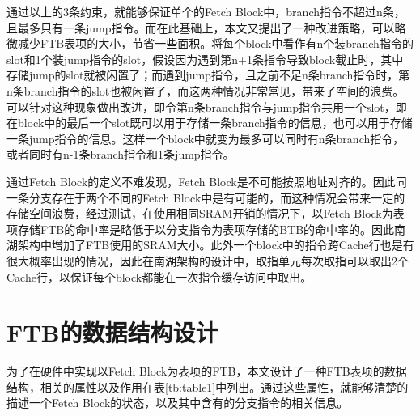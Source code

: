 通过以上的3条约束，就能够保证单个的Fetch Block中，branch指令不超过n条，且最多只有一条jump指令。而在此基础上，本文又提出了一种改进策略，可以略微减少FTB表项的大小，节省一些面积。将每个block中看作有n个装branch指令的slot和1个装jump指令的slot，假设因为遇到第n+1条指令导致block截止时，其中存储jump的slot就被闲置了；而遇到jump指令，且之前不足n条branch指令时，第n条branch指令的slot也被闲置了，而这两种情况非常常见，带来了空间的浪费。可以针对这种现象做出改进，即令第n条branch指令与jump指令共用一个slot，即在block中的最后一个slot既可以用于存储一条branch指令的信息，也可以用于存储一条jump指令的信息。这样一个block中就变为最多可以同时有n条branch指令，或者同时有n-1条branch指令和1条jump指令。

通过Fetch Block的定义不难发现，Fetch Block是不可能按照地址对齐的。因此同一条分支存在于两个不同的Fetch Block中是有可能的，而这种情况会带来一定的存储空间浪费，经过测试，在使用相同SRAM开销的情况下，以Fetch Block为表项存储FTB的命中率是略低于以分支指令为表项存储的BTB的命中率的。因此南湖架构中增加了FTB使用的SRAM大小。此外一个block中的指令跨Cache行也是有很大概率出现的情况，因此在南湖架构的设计中，取指单元每次取指可以取出2个Cache行，以保证每个block都能在一次指令缓存访问中取出。

\section{FTB的数据结构设计}


为了在硬件中实现以Fetch Block为表项的FTB，本文设计了一种FTB表项的数据结构，相关的属性以及作用在表\ref{tb:table1}中列出。通过这些属性，就能够清楚的描述一个Fetch Block的状态，以及其中含有的分支指令的相关信息。

